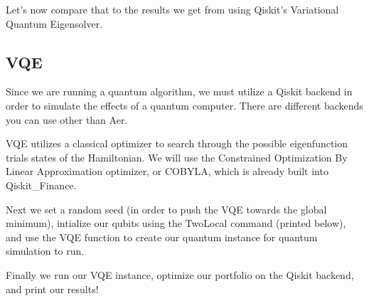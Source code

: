 \documentclass[11pt]{article}
\begin{document}
    Let's now compare that to the results we get from using Qiskit's
Variational Quantum Eigensolver.

    \hypertarget{vqe}{%
\subsection{VQE}\label{vqe}}

Since we are running a quantum algorithm, we must utilize a Qiskit
backend in order to simulate the effects of a quantum computer. There
are different backends you can use other than Aer.

VQE utilizes a classical optimizer to search through the possible
eigenfunction trials states of the Hamiltonian. We will use the
Constrained Optimization By Linear Approximation optimizer, or COBYLA,
which is already built into Qiskit\_Finance.

Next we set a random seed (in order to push the VQE towards the global
minimum), intialize our qubits using the TwoLocal command (printed
below), and use the VQE function to create our quantum instance for
quantum simulation to run.

Finally we run our VQE instance, optimize our portfolio on the Qiskit
backend, and print our results!
\end{document}
